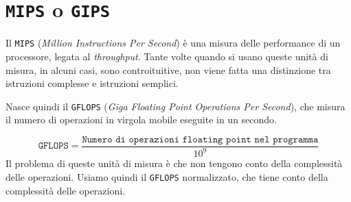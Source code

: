 \section{\texttt{MIPS} o \texttt{GIPS}}
Il \texttt{MIPS} (\textit{Million Instructions Per Second}) è una
misura delle performance di un processore, legata al \textit{throughput}.
Tante volte quando si usano queste unità di misura, in alcuni casi, 
sono controituitive, non viene fatta una distinzione tra istruzioni complesse 
e istruzioni semplici.

Nasce quindi il \texttt{GFLOPS} (\textit{Giga Floating Point Operations Per Second}),
che misura il numero di operazioni in virgola mobile eseguite in un secondo.

\[
  \texttt{GFLOPS} = \frac{\texttt{Numero di operazioni floating point nel programma}}{10^9}
\]
Il problema di queste unità di misura è che non tengono conto
della complessità delle operazioni.
Usiamo quindi il \texttt{GFLOPS} normalizzato, che tiene conto
della complessità delle operazioni.